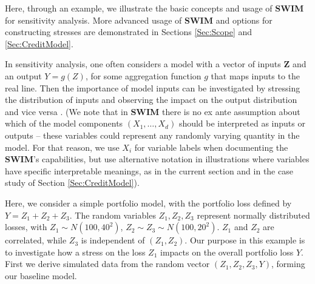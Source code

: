 \documentclass[
]{article}
\begin{document}
Here, through an example, we illustrate the basic concepts and usage of \textbf{SWIM} for sensitivity analysis. More advanced usage of \textbf{SWIM} and options for constructing stresses are demonstrated in Sections \ref{Sec:Scope} and \ref{Sec:CreditModel}.

In sensitivity analysis, one often considers a model with a vector of inputs \(\mathbf Z\) and an output \(Y=g(Z)\), for some aggregation function \(g\) that maps inputs to the real line. Then the importance of model inputs can be investigated by stressing the distribution of inputs and observing the impact on the output distribution and vice versa \citep{Pesenti2019}. (We note that in \textbf{SWIM} there is no ex ante assumption about which of the model components \((X_1, \dots,X_d)\) should be interpreted as inputs or outputs -- these variables could represent any randomly varying quantity in the model. For that reason, we use \(X_i\) for variable labels when documenting the \textbf{SWIM}'s capabilities, but use alternative notation in illustrations where variables have specific interpretable meanings, as in the current section and in the case study of Section \ref{Sec:CreditModel}).

Here, we consider a simple portfolio model, with the portfolio loss defined by \(Y=Z_1+Z_2+Z_3\). The random variables \(Z_1,Z_2,Z_3\) represent normally distributed losses, with \(Z_1\sim N(100,40^2)\), \(Z_2\sim Z_3\sim N(100,20^2)\). \(Z_1\) and \(Z_2\) are correlated, while \(Z_3\) is independent of \((Z_1,Z_2)\). Our purpose in this example is to investigate how a stress on the loss \(Z_1\) impacts on the overall portfolio loss \(Y\).
First we derive simulated data from the random vector \((Z_1,Z_2,Z_3,Y)\), forming our baseline model.
\end{document}

